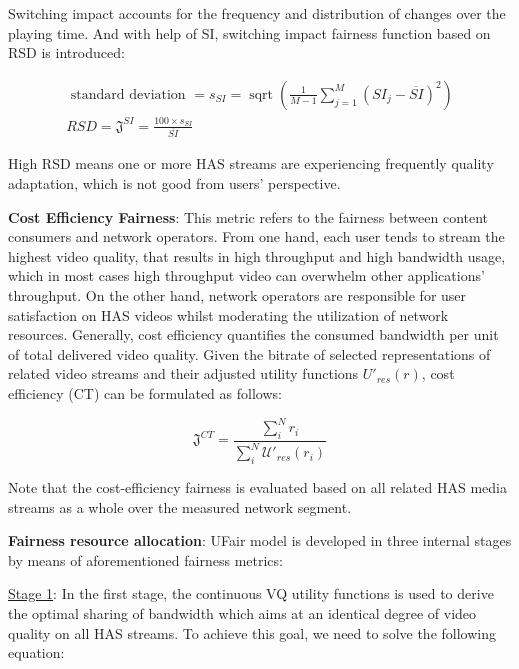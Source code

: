 \documentclass{article}
\begin{document}
Switching impact accounts for the frequency and distribution of changes over the playing time. And with help of SI, switching impact fairness function based on RSD is introduced:

\begin{equation}
\begin{gathered}
\text { standard deviation }=s_{S I}=\operatorname{sqrt}\left(\frac{1}{M-1} \sum_{j=1}^{M}\left(S I_{j}-\overline{S I}\right)^{2}\right) \\
R S D=\mathfrak{J}^{S I}=\frac{100 \times s_{S I}}{\overline{S I}}
\end{gathered}
\end{equation}

High RSD means one or more HAS streams are experiencing frequently quality adaptation, which is not good from users' perspective.

\textbf{Cost Efficiency Fairness}: This metric refers to the fairness between content consumers and network operators. From one hand, each user tends to stream the highest video quality, that results in high throughput and high bandwidth usage, which in most cases high throughput video can overwhelm other applications’ throughput. On the other hand, network operators are responsible for user satisfaction on HAS videos whilst moderating the utilization of network resources.
Generally, cost efficiency quantifies the consumed bandwidth per unit of total delivered video quality. Given the bitrate of selected representations of related video streams and their adjusted utility functions $U\prime_{res}(r)$, cost efficiency (CT) can be formulated as follows:

\begin{equation}
\mathfrak{J}^{C T}=\frac{\sum_{i}^{N} r_{i}}{\sum_{i}^{N} \mathcal{U\prime}_{r e s}\left(r_{i}\right)}
\end{equation}

Note that the cost-efficiency fairness is evaluated based on all related HAS media streams as a whole over the measured network segment.

\textbf{Fairness resource allocation}: UFair model is developed in three internal stages by means of aforementioned fairness metrics:

\underline{Stage 1}: In the first stage, the continuous VQ utility functions is used to derive the optimal sharing of bandwidth which aims at an identical degree of video quality on all HAS streams. To achieve this goal, we need to solve the following equation:
\end{document}
